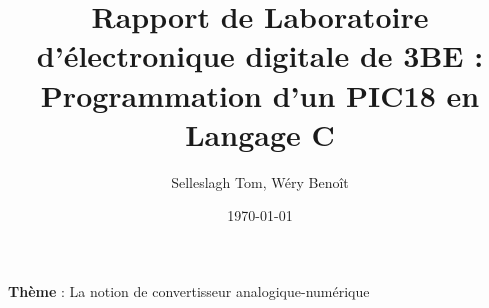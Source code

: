 \documentclass[11pt,a4paper]{article}
\title{Rapport de Laboratoire d'électronique digitale de 3BE : Programmation d'un PIC18 en Langage C}
\date{\today}
\author{Selleslagh Tom, Wéry Benoît}
\begin{document}
	\maketitle
	\textbf{Thème} : La notion de convertisseur analogique-numérique
	
	
	
	
	
	
\end{document}

